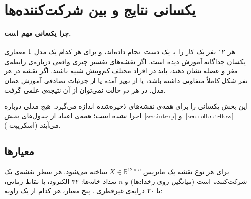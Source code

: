 \FloatBarrier
\section{یکسانی نتایج  و  بین شرکت‌کننده‌ها}
\label{sec:consistency}

\paragraph{چرا یکسانی مهم است.} هر ۱۲ نفر یک کار را با یک دست انجام داده‌اند، و برای هر کدام یک مدل با معماری یکسان جداگانه آموزش دیده است. اگر نقشه‌های تفسیر چیزی واقعی درباره‌ی رابطه‌ی مغز و عضله نشان دهند، باید در افراد مختلف کم‌وبیش شبیه باشند. اگر نقشه در هر نفر شکل کاملاً متفاوتی داشته باشد، یا از نویز آمده یا از جزئیات تصادفی آموزش همان مدل. در هر دو حالت نمی‌توان از آن نتیجه‌ی علمی گرفت.

این بخش یکسانی را برای همه‌ی نقشه‌های ذخیره‌شده اندازه می‌گیرد. هیچ مدلی دوباره اجرا نشده است؛ همه‌ی اعداد از جدول‌های بخش~\ref{sec:interp} و~\ref{sec:rollout-flow} می‌آیند (اسکریپت ).

\subsection{معیارها}

برای هر نوع نقشه یک ماتریس $X\in\mathbb{R}^{12\times n}$ ساخته می‌شود. هر سطر نقشه‌ی یک شرکت‌کننده است (میانگین روی رخدادها) و $n$ تعداد خانه‌ها: ۳۲ الکترود، یا نقاط زمانی، یا ۲۰ درایه‌ی غیرقطری . پنج معیار، هر کدام از یک زاویه:


